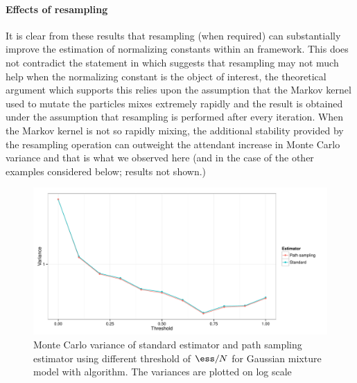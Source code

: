 \paragraph{Effects of resampling}

It is clear from these results that resampling (when required) can
substantially improve the estimation of normalizing constants within an \smc
framework. This does not contradict the statement in \cite{DelMoral:2006hc}
which suggests that resampling may not much help when the normalizing constant
is the object of interest, the theoretical argument which supports this relies
upon the assumption that the Markov kernel used to mutate the particles mixes
extremely rapidly and the result is obtained under the assumption that
resampling is performed after every iteration. When the Markov kernel is not
so rapidly mixing, the additional stability provided by the resampling
operation can outweight the attendant increase in Monte Carlo variance and
that is what we observed here (and in the case of the other examples
considered below; results not shown.)

\begin{figure}
  \includegraphics[width=\linewidth]{fig/GMM_Resample}
  \caption[Variance of standard standard estimator and path sampling using
  adaptive resampling]
  {Monte Carlo variance of standard estimator and path sampling
    estimator using different threshold of $\ess/N$ for Gaussian mixture model
    with \smc[2] algorithm. The variances are plotted on log scale}
  \label{fig:gmm resample}
\end{figure}

